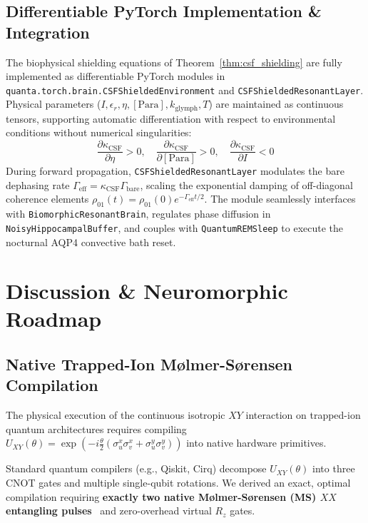 \documentclass[10pt,twocolumn,3p]{article}
\begin{document}
\subsection{Differentiable PyTorch Implementation \& Integration}
\label{subsec:csf_pytorch_impl}

The biophysical shielding equations of Theorem~\ref{thm:csf_shielding} are fully implemented as differentiable PyTorch modules in \texttt{quanta.torch.brain.CSFShieldedEnvironment} and \texttt{CSFShieldedResonantLayer}. Physical parameters ($I, \epsilon_r, \eta, [\text{Para}], k_{\text{glymph}}, T$) are maintained as continuous tensors, supporting automatic differentiation with respect to environmental conditions without numerical singularities:
\begin{equation}
    \frac{\partial \kappa_{\text{CSF}}}{\partial \eta} > 0, \quad \frac{\partial \kappa_{\text{CSF}}}{\partial [\text{Para}]} > 0, \quad \frac{\partial \kappa_{\text{CSF}}}{\partial I} < 0
\end{equation}
During forward propagation, \texttt{CSFShieldedResonantLayer} modulates the bare dephasing rate $\Gamma_{\text{eff}} = \kappa_{\text{CSF}} \Gamma_{\text{bare}}$, scaling the exponential damping of off-diagonal coherence elements $\rho_{01}(t) = \rho_{01}(0) e^{-\Gamma_{\text{eff}} t / 2}$. The module seamlessly interfaces with \texttt{BiomorphicResonantBrain}, regulates phase diffusion in \texttt{NoisyHippocampalBuffer}, and couples with \texttt{QuantumREMSleep} to execute the nocturnal AQP4 convective bath reset.

\section{Discussion \& Neuromorphic Roadmap}
\label{sec:discussion}


\subsection{Native Trapped-Ion M\o lmer-S\o rensen Compilation}
\label{subsec:ms_compilation}

The physical execution of the continuous isotropic $XY$ interaction on trapped-ion quantum architectures requires compiling $U_{XY}(\theta) = \exp\left( -i \frac{\theta}{2} (\sigma_u^x \sigma_v^x + \sigma_u^y \sigma_v^y) \right)$ into native hardware primitives.

Standard quantum compilers (e.g., Qiskit, Cirq) decompose $U_{XY}(\theta)$ into three CNOT gates and multiple single-qubit rotations. We derived an exact, optimal compilation requiring \textbf{exactly two native M\o lmer-S\o rensen (MS) $XX$ entangling pulses}~\cite{molmer1999} and zero-overhead virtual $R_z$ gates.
\end{document}
